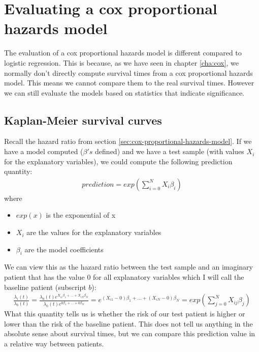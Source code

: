\section{Evaluating a cox proportional hazards model}
\label{sec:evaluation-coxph}
The evaluation of a cox proportional hazards model is different compared to logistic regression. This is because, as we have seen in chapter \ref{cha:cox}, we normally don't directly compute survival times from a cox proportional hazards model. This means we cannot compare them to the real survival times. However we can still evaluate the models based on statistics that indicate significance.

\subsection{Kaplan-Meier survival curves}
Recall the hazard ratio from section \ref{sec:cox-proportional-hazards-model}. If we have a model computed ($\beta's$ defined) and we have a test sample (with values $X_{i}$ for the explanatory variables), we could compute the following prediction quantity:
\begin{equation}
\begin{split}
prediction = exp(\sum_{i=0}^{N}X_{i}\beta_{i})
\end{split}
\end{equation}
where
\begin{itemize}
	\item $exp(x)$ is the exponential of x
	\item $X_{i}$ are the values for the explanatory variables
	\item $\beta_{i}$ are the model coefficients
\end{itemize}
 We can view this as the hazard ratio between the test sample and an imaginary patient that has the value $0$ for all explanatory variables which I will call the baseline patient (subscript $b$):
 \begin{equation}
 \begin{split}
 \frac{\lambda_{i}(t)}{\lambda_{b}(t)} 
 = \frac{\lambda_{0}(t)e^{X_{i1}\beta_{1} + ... + X_{iN}\beta_{N}}}{\lambda_{0}(t)e^{0\beta_{1} + ... + 0\beta_{N}}}
 = e^{(X_{i1}-0)\beta_{1} + ... + (X_{iN}-0)\beta_{N}} = exp(\sum_{j=0}^{N}X_{ij}\beta_{j})
 \end{split}
 \end{equation}
 What this quantity tells us is whether the risk of our test patient is higher or lower than the risk of the baseline patient. This does not tell us anything in the absolute sense about survival times, but we can compare this prediction value in a relative way between patients. \\ \\
